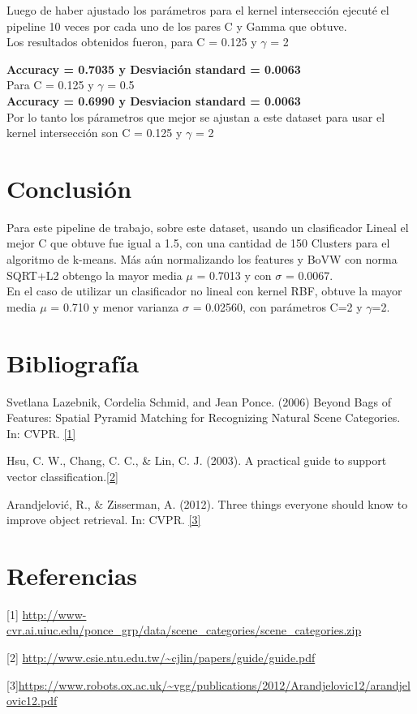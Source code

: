 \documentclass[11pt, spanish, a4paper]{article}
\begin{document}
Luego de haber ajustado los parámetros para el kernel intersección ejecuté el pipeline 10 veces por cada uno de los pares C y Gamma que obtuve. \\


Los resultados obtenidos fueron, para C = 0.125 y \(\gamma\) = 2

\textbf{Accuracy = 0.7035 y Desviación standard = 0.0063}\\

Para C = 0.125 y  \(\gamma\) = 0.5\\
\textbf{Accuracy = 0.6990 y Desviacion standard = 0.0063} \\

Por lo tanto los párametros que mejor se ajustan a este dataset para usar el kernel intersección son C = 0.125 y \(\gamma\) = 2 \\


\section{Conclusión}
Para este pipeline de trabajo, sobre este dataset, usando un clasificador Lineal el mejor C que obtuve fue igual a 1.5, con una cantidad de 150 Clusters para el algoritmo de k-means. Más aún normalizando los features y BoVW con norma SQRT+L2 obtengo la mayor media \(\mu\) = 0.7013 y con  \(\sigma\) = 0.0067.\\
En el caso de utilizar un clasificador no lineal con kernel RBF, obtuve la mayor media \(\mu\) = 0.710 y menor varianza \(\sigma\) = 0.02560, con parámetros C=2 y \(\gamma\)=2.

\section{Bibliografía}
Svetlana Lazebnik, Cordelia Schmid, and Jean Ponce. (2006) Beyond Bags of
Features: Spatial Pyramid Matching for Recognizing Natural Scene Categories. In:
CVPR. \hyperref[link:1]{[1]}


Hsu, C. W., Chang, C. C., \& Lin, C. J. (2003). A practical guide to support
vector classification.\hyperref[link:2]{[2]}

Arandjelović, R., \& Zisserman, A. (2012). Three things everyone should know to
improve object retrieval. In: CVPR.  \hyperref[link:3]{[3]}

\section{Referencias}

\label{link:1}
[1] \url{http://www-cvr.ai.uiuc.edu/ponce_grp/data/scene_categories/scene_categories.zip}


\label{link:2}
[2] \url{http://www.csie.ntu.edu.tw/~cjlin/papers/guide/guide.pdf}


\label{link:3}
[3]\url{https://www.robots.ox.ac.uk/~vgg/publications/2012/Arandjelovic12/arandjelovic12.pdf}
\end{document}
